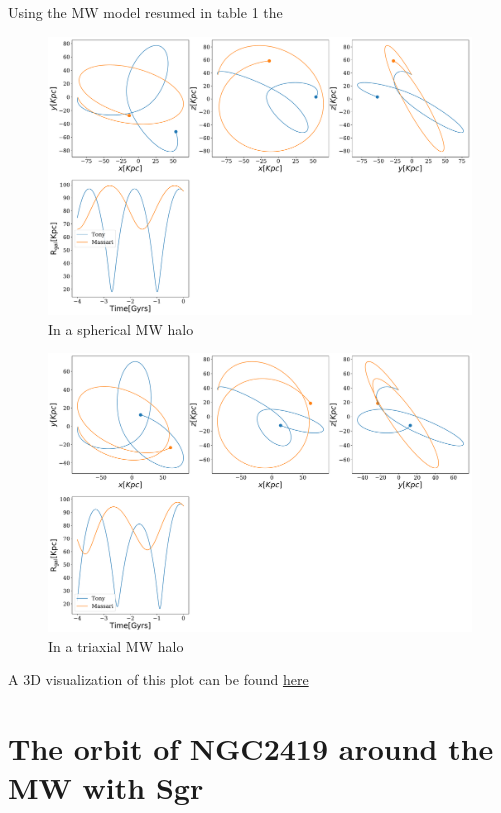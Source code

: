 \documentclass[14pt]{article}
\begin{document}
Using the MW model resumed in table 1 the 

\begin{figure}[H]
\centering
\includegraphics[scale=0.2]{../exploratory_code/NGC2419_sphMW.pdf}
\caption{In a spherical MW halo}
\end{figure}

\begin{figure}[H]
\centering
\includegraphics[scale=0.2]{../exploratory_code/NGC2419_Triaxial_MW.pdf}
\caption{In a triaxial MW halo}
\end{figure}

A 3D visualization of this plot can be found 
\href{https://plot.ly/~jngc/3/orbits/?share_key=FcyuVOnd0LYVXaYhGmSuo9}{here}


\section{The orbit of NGC2419 around the MW with Sgr}
\end{document}
